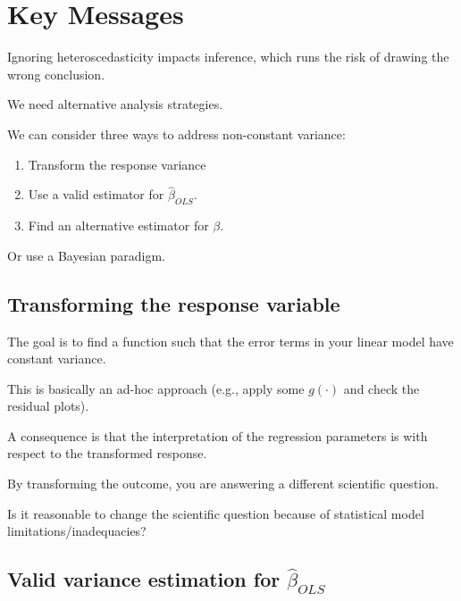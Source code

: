 \documentclass[
  letterpaper,
  DIV=11,
  numbers=noendperiod]{scrreport}
\providecommand{\tightlist}{%
  \setlength{\itemsep}{0pt}\setlength{\parskip}{0pt}}\usepackage{longtable,booktabs,array}
\begin{document}

\hypertarget{key-messages}{%
\chapter{Key Messages}\label{key-messages}}

Ignoring heteroscedasticity impacts inference, which runs the risk of
drawing the wrong conclusion.

We need alternative analysis strategies.

We can consider three ways to address non-constant variance:

\begin{enumerate}
\def\labelenumi{\arabic{enumi}.}
\tightlist
\item
  Transform the response variance
\item
  Use a valid estimator for \(\hat \beta_{OLS}\).
\item
  Find an alternative estimator for \(\beta\).
\end{enumerate}

Or use a Bayesian paradigm.

\hypertarget{transforming-the-response-variable}{%
\section{Transforming the response
variable}\label{transforming-the-response-variable}}

The goal is to find a function such that the error terms in your linear
model have constant variance.

This is basically an ad-hoc approach (e.g., apply some \(g(\cdot)\) and
check the residual plots).

A consequence is that the interpretation of the regression parameters is
with respect to the transformed response.

By transforming the outcome, you are answering a different scientific
question.

Is it reasonable to change the scientific question because of
statistical model limitations/inadequacies?

\hypertarget{valid-variance-estimation-for-hat-beta_ols}{%
\section{\texorpdfstring{Valid variance estimation for
\(\hat \beta_{OLS}\)}{Valid variance estimation for \textbackslash hat \textbackslash beta\_\{OLS\}}}\label{valid-variance-estimation-for-hat-beta_ols}}
\end{document}
